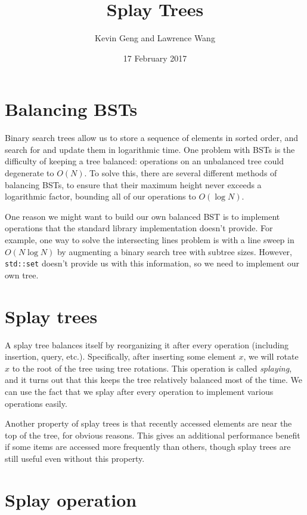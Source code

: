 \documentclass{article}
\title{Splay Trees}
\author{Kevin Geng and Lawrence Wang}
\date{17 February 2017}
\begin{document}
\maketitle

\section{Balancing BSTs}

Binary search trees allow us to store a sequence of elements in sorted order, and search for and update them in logarithmic time. One problem with BSTs is the difficulty of keeping a tree balanced: operations on an unbalanced tree could degenerate to $O(N)$. To solve this, there are several different methods of balancing BSTs, to ensure that their maximum height never exceeds a logarithmic factor, bounding all of our operations to $O(\log N)$.

One reason we might want to build our own balanced BST is to implement operations that the standard library implementation doesn't provide. For example, one way to solve the intersecting lines problem is with a line sweep in $O(N \log N)$ by augmenting a binary search tree with subtree sizes. However, \verb|std::set| doesn't provide us with this information, so we need to implement our own tree.

\section{Splay trees}

A splay tree balances itself by reorganizing it after every operation (including insertion, query, etc.). Specifically, after inserting some element $x$, we will rotate $x$ to the root of the tree using tree rotations. This operation is called \textit{splaying}, and it turns out that this keeps the tree relatively balanced most of the time. We can use the fact that we splay after every operation to implement various operations easily.

Another property of splay trees is that recently accessed elements are near the top of the tree, for obvious reasons. This gives an additional performance benefit if some items are accessed more frequently than others, though splay trees are still useful even without this property.

\section{Splay operation}
\end{document}
